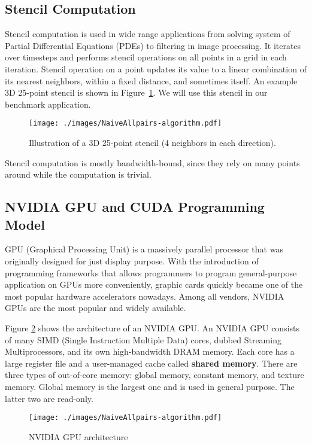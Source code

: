 \subsection{Stencil Computation}
Stencil computation is used in wide range applications from solving system of Partial Differential Equations (PDEs) to filtering in image processing. It iterates over timesteps and performs stencil operations on all points in a grid in each iteration. Stencil operation on a point updates its value to a linear combination of its nearest neighbors, within a fixed distance, and sometimes itself. An example 3D 25-point stencil is shown in Figure~\ref{fig:25-point_stencil}. We will use this stencil in our benchmark application.

\begin{figure}
\centering
\texttt{[image: ./images/NaiveAllpairs-algorithm.pdf]}
\caption{Illustration of a 3D 25-point stencil (4 neighbors in each direction).}
\label{fig:25-point_stencil}
\end{figure}

Stencil computation is mostly bandwidth-bound, since they rely on many points around while the computation is trivial.

\subsection{NVIDIA GPU and CUDA Programming Model}
GPU (Graphical Processing Unit) is a massively parallel processor that was originally designed for just display purpose. With the introduction of programming frameworks that allows programmers to program general-purpose application on GPUs more conveniently, graphic cards quickly became one of the most popular hardware accelerators nowadays. Among all vendors, NVIDIA GPUs are the most popular and widely available.

Figure \ref{fig:gpu-arch} shows the architecture of an NVIDIA GPU. An NVIDIA GPU consists of many SIMD (Single Instruction Multiple Data) cores, dubbed Streaming Multiprocessors, and its own high-bandwidth DRAM memory. Each core has a large register file and a user-managed cache called \textbf{shared memory}. There are three types of out-of-core memory: global memory, constant memory, and texture memory. Global memory is the largest one and is used in general purpose. The latter two are read-only.

\begin{figure}
\centering
\texttt{[image: ./images/NaiveAllpairs-algorithm.pdf]}
\caption{NVIDIA GPU architecture}
\label{fig:gpu-arch}
\end{figure}

